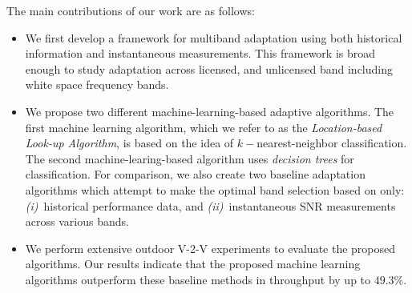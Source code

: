 The main contributions of our work are as follows:
\begin{itemize}
\item We first develop a framework for multiband adaptation using both historical information and instantaneous measurements. This framework is broad enough to study adaptation across licensed, and unlicensed band including white space frequency bands.  

\item We propose two different machine-learning-based adaptive algorithms. The 
first machine learning algorithm, which we refer to as the \emph{Location-based 
Look-up Algorithm}, 
is based on the idea of $k-$nearest-neighbor classification. The second machine-learing-based 
algorithm uses \emph{decision trees} for classification. 
For comparison, we also create two baseline adaptation algorithms which attempt to make the optimal band selection based on only: {\it (i)}~historical 
performance data, and {\it (ii)}~instantaneous SNR measurements across 
various bands. 



\item We perform extensive outdoor V-2-V experiments to evaluate the proposed algorithms.
Our results indicate that the proposed machine learning algorithms outperform 
these baseline methods in throughput by up to $49.3\%$.

\end{itemize}





